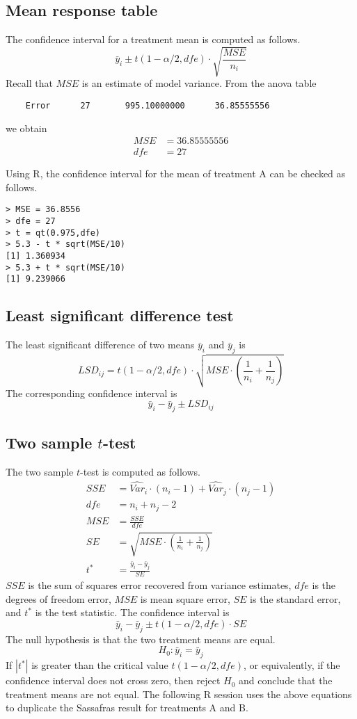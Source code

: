 \documentclass[11pt]{article}
\begin{document}
\subsection*{Mean response table}
The confidence interval for a treatment mean is computed as follows.
\[
\bar y_i\pm t(1-\alpha/2,dfe)\cdot\sqrt{\frac{MSE}{n_i}}
\]
Recall that $MSE$ is an estimate of model variance.
From the anova table

\begin{Verbatim}
    Error      27       995.10000000      36.85555556
\end{Verbatim}

we obtain
\begin{align*}
MSE&=36.85555556\\
dfe&=27
\end{align*}

Using R, the confidence interval for the mean of treatment A can be
checked as follows.

\begin{Verbatim}
> MSE = 36.8556
> dfe = 27
> t = qt(0.975,dfe)
> 5.3 - t * sqrt(MSE/10)
[1] 1.360934
> 5.3 + t * sqrt(MSE/10)
[1] 9.239066
\end{Verbatim}

\subsection*{Least significant difference test}
The least significant difference of two means
$\bar y_i$ and $\bar y_j$ is
\[
LSD_{ij}=t(1-\alpha/2,dfe)\cdot\sqrt{MSE\cdot
\left(\frac{1}{n_i}+\frac{1}{n_j}\right)}
\]
The corresponding confidence interval is
\[
\bar y_i-\bar y_j\pm LSD_{ij}
\]

\subsection*{Two sample $t$-test}
The two sample $t$-test is computed as follows.
\begin{align*}
SSE&=\widehat{Var}_i\cdot(n_i-1)+\widehat{Var}_j\cdot(n_j-1)\\
dfe&=n_i+n_j-2\\
MSE&=\frac{SSE}{dfe}\\
SE&=\sqrt{MSE\cdot\left(\frac{1}{n_i}+\frac{1}{n_j}\right)}\\
t^*&=\frac{\bar y_i-\bar y_j}{SE}
\end{align*}
$SSE$ is the sum of squares error recovered from
variance estimates, $dfe$ is the degrees of freedom error, $MSE$
is mean square error, $SE$ is the standard error, and $t^*$ is the
test statistic.
The confidence interval is
\[
\bar y_i-\bar y_j\pm t(1-\alpha/2,dfe)\cdot SE
\]
The null hypothesis is that the two treatment means are equal.
\[
H_0:\bar y_i=\bar y_j
\]
If $|t^*|$ is greater than the critical value $t(1-\alpha/2,dfe)$,
or equivalently, if the confidence interval does not cross zero,
then reject $H_0$ and conclude that the treatment means are not equal.
The following R session uses the above equations
to duplicate the Sassafras result for
treatments A and B.
\end{document}
